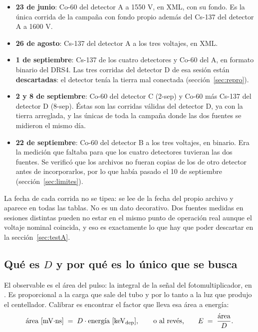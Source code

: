 \documentclass[11pt,a4paper]{article}
\begin{document}
\begin{itemize}
\item \textbf{23 de junio}: Co-60 del detector A a 1550 V, en XML, con su
      fondo. Es la única corrida de la campaña con fondo propio además del
      Cs-137 del detector A a 1600 V.
\item \textbf{26 de agosto}: Cs-137 del detector A a los tres voltajes, en XML.
\item \textbf{1 de septiembre}: Cs-137 de los cuatro detectores y Co-60 del A,
      en formato binario del DRS4. Las tres corridas del detector D de esa
      sesión están \textbf{descartadas}: el detector tenía la tierra mal
      conectada (sección~\ref{sec:repro}).
\item \textbf{2 y 8 de septiembre}: Co-60 del detector C (2-sep) y Co-60 más
      Cs-137 del detector D (8-sep). Éstas son las corridas válidas del
      detector D, ya con la tierra arreglada, y las únicas de toda la campaña
      donde las dos fuentes se midieron el mismo día.
\item \textbf{22 de septiembre}: Co-60 del detector B a los tres voltajes, en
      binario. Era la medición que faltaba para que los cuatro detectores
      tuvieran las dos fuentes. Se verificó que los archivos no fueran copias
      de los de otro detector antes de incorporarlos, por lo que había pasado
      el 10 de septiembre (sección~\ref{sec:limites}).
\end{itemize}

La fecha de cada corrida no se tipea: se lee de la fecha del propio archivo y
aparece en todas las tablas. No es un dato decorativo. Dos fuentes medidas en
sesiones distintas pueden no estar en el mismo punto de operación real aunque
el voltaje nominal coincida, y eso es exactamente lo que hay que poder
descartar en la sección~\ref{sec:testA}.

\subsection{Qué es $D$ y por qué es lo único que se busca}

El observable es el área del pulso: la integral de la señal del
fotomultiplicador, en \mVns. Es proporcional a la carga que sale del tubo y por
lo tanto a la luz que produjo el centellador. Calibrar es encontrar el factor
que lleva esa área a energía:
\[
   \text{área [mV$\cdot$ns]} \;=\; D \cdot \text{energía [keV\textsubscript{dep}]},
   \qquad\text{o al revés,}\qquad
   E \;=\; \frac{\text{área}}{D}.
\]
\end{document}
